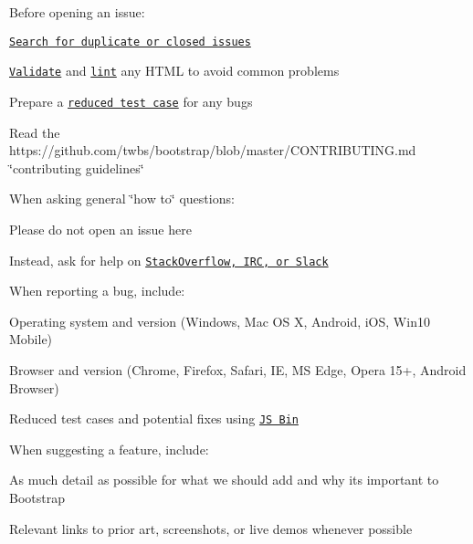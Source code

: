 Before opening an issue\+:


\begin{DoxyItemize}
\item \href{https://github.com/twbs/bootstrap/issues?utf8=%E2%9C%93&q=is%3Aissue}{\tt Search for duplicate or closed issues}
\item \href{http://validator.w3.org/nu/}{\tt Validate} and \href{https://github.com/twbs/bootlint#in-the-browser}{\tt lint} any H\+T\+ML to avoid common problems
\item Prepare a \href{https://css-tricks.com/reduced-test-cases/}{\tt reduced test case} for any bugs
\item Read the https\+://github.com/twbs/bootstrap/blob/master/\+C\+O\+N\+T\+R\+I\+B\+U\+T\+I\+N\+G.\+md \char`\"{}contributing guidelines\char`\"{}
\end{DoxyItemize}

When asking general \char`\"{}how to\char`\"{} questions\+:


\begin{DoxyItemize}
\item Please do not open an issue here
\item Instead, ask for help on \href{https://github.com/twbs/bootstrap/blob/master/README.md#community}{\tt Stack\+Overflow, I\+RC, or Slack}
\end{DoxyItemize}

When reporting a bug, include\+:


\begin{DoxyItemize}
\item Operating system and version (Windows, Mac OS X, Android, i\+OS, Win10 Mobile)
\item Browser and version (Chrome, Firefox, Safari, IE, MS Edge, Opera 15+, Android Browser)
\item Reduced test cases and potential fixes using \href{https://jsbin.com}{\tt JS Bin}
\end{DoxyItemize}

When suggesting a feature, include\+:


\begin{DoxyItemize}
\item As much detail as possible for what we should add and why it\textquotesingle{}s important to Bootstrap
\item Relevant links to prior art, screenshots, or live demos whenever possible 
\end{DoxyItemize}